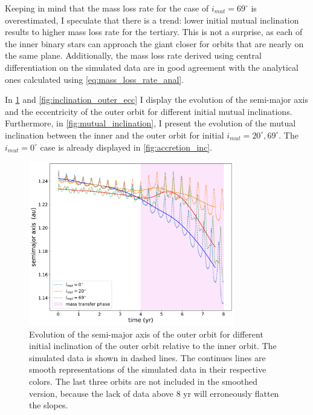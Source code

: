 Keeping in mind that the mass loss rate for the case of $i_{mut} = 69^{\circ}$ is overestimated, I speculate that there is a trend: lower initial mutual inclination results to higher mass loss rate for the tertiary. This is not a surprise, as each of the inner binary stars can approach the giant closer for orbits that are nearly on the same plane. Additionally, the mass loss rate derived using central differentiation on the simulated data are in good agreement with the analytical ones calculated using \cref{eq:mass_loss_rate_anal}.

In \cref{fig:inclination_outer_semimajor_axis} and \cref{fig:inclination_outer_ecc} I display the evolution of the semi-major axis and the eccentricity of the outer orbit for different initial mutual inclinations. Furthermore, in \cref{fig:mutual_inclination}, I present the evolution of the mutual inclination between the inner and the outer orbit for initial $i_{mut} = 20^{\circ}, 69^{\circ}$.  The $i_{mut} = 0^{\circ}$ case is already displayed in \cref{fig:accretion_inc}.  

\begin{figure}[!htb]
    \centering
    \includegraphics[width=0.8\textwidth]{Thesis/graphs/inclination_case/inclination_outer_semimajor_axis.pdf}
    \caption{Evolution of the semi-major axis of the outer orbit for different initial inclination of the outer orbit relative to the inner orbit. The simulated data is shown in dashed lines. The continues lines are smooth representations of the simulated data in their respective colors. The last three orbits are not included in the smoothed version, because the lack of data above $8$ yr will erroneously flatten the slopes.}
    \label{fig:inclination_outer_semimajor_axis}
\end{figure}

